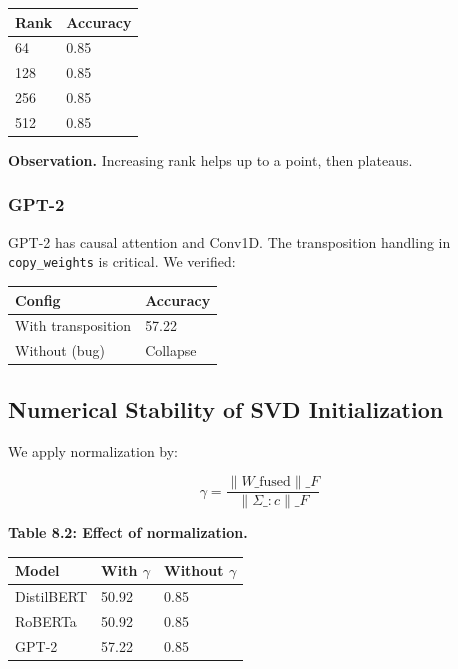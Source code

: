 \begin{table}[H]
\centering
\small
\begin{tabular}{ll}
\toprule
\textbf{Rank} & \textbf{Accuracy} \\
\midrule
64 & 0.85 \\
128 & 0.85 \\
256 & 0.85 \\
512 & 0.85 \\
\bottomrule
\end{tabular}
\end{table}

\textbf{Observation.} Increasing rank helps up to a point, then plateaus.

\subsubsection{GPT-2}

GPT-2 has causal attention and Conv1D. The transposition handling in 
\texttt{copy\_weights} is critical. We verified:

\begin{table}[H]
\centering
\small
\begin{tabular}{ll}
\toprule
\textbf{Config} & \textbf{Accuracy} \\
\midrule
With transposition & 57.22 \\
Without (bug) & Collapse \\
\bottomrule
\end{tabular}
\end{table}

\subsection{Numerical Stability of SVD Initialization}

We apply normalization by:

\[
\gamma = \frac{\|W\_\text{fused}\|\_F}{\|\Sigma\_{:c}\|\_F}
\tag{8.1}
\]

\textbf{Table 8.2: Effect of normalization.}

\begin{table}[H]
\centering
\small
\begin{tabular}{lll}
\toprule
\textbf{Model} & \textbf{With $\gamma$} & \textbf{Without $\gamma$} \\
\midrule
DistilBERT & 50.92 & 0.85 \\
RoBERTa & 50.92 & 0.85 \\
GPT-2 & 57.22 & 0.85 \\
\bottomrule
\end{tabular}
\end{table}

